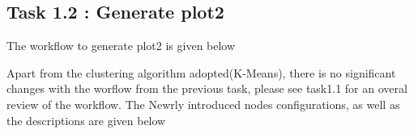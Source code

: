 \documentclass[11pt]{article}
\begin{document}
		\subsection*{Task 1.2 : Generate plot2}
			The workflow to generate plot2 is given below

			Apart from the clustering algorithm adopted(K-Means), there is no significant changes with the worflow from the previous task, please see task1.1 for an overal review of the workflow. The Newrly introduced nodes configurations, as well as the descriptions are given below
			
\end{document}
